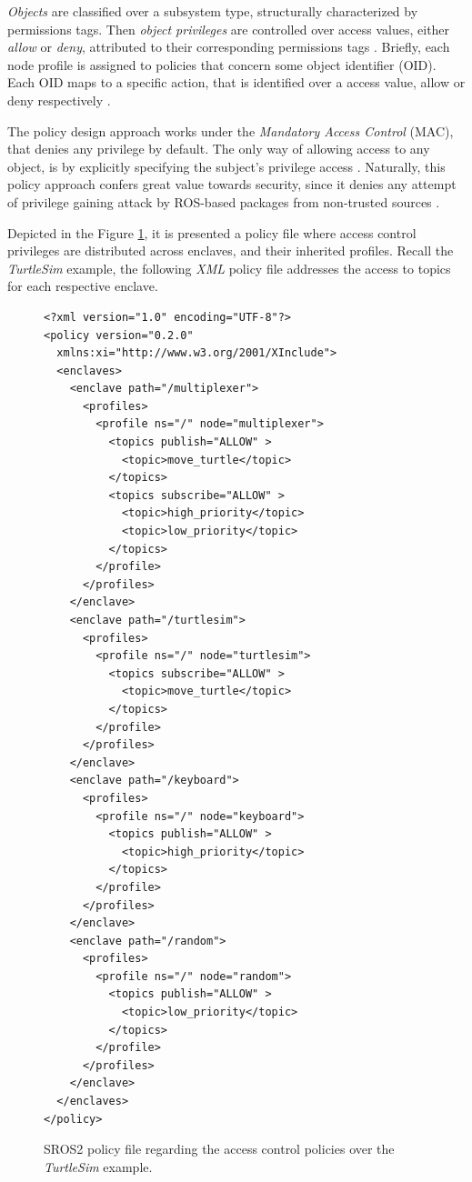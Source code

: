 \textit{Objects} are classified over a subsystem type, structurally characterized by permissions tags. Then \textit{object privileges} are controlled over access values, either \textit{allow} or \textit{deny}, attributed to their corresponding permissions tags \cite{ros-access-control, white2018procedurally}. Briefly, each node profile is assigned to policies that concern some object identifier (OID). Each OID maps to a specific action, that is identified over a access value, allow or deny respectively \cite{white2016sros}.

The policy design approach works under the \textit{Mandatory Access Control} (MAC), that denies any privilege by default. The only way of allowing access to any object, is by explicitly specifying the subject's privilege access \cite{ros-access-control, white2018procedurally, white2016sros}. Naturally, this policy approach confers great value towards security, since it denies any attempt of privilege gaining attack by ROS-based packages from non-trusted sources \cite{white2016sros}.

Depicted in the Figure \ref{fig:ros-access-file}, it is presented a policy file where access control privileges are distributed across enclaves, and their inherited profiles. Recall the \textit{TurtleSim} example, the following \textit{XML} policy file addresses the access to topics for each respective enclave. 

\begin{figure}[H]
\begin{lstlisting}[otherkeywords = {xml, version, encoding, policy, version, enclave, enclaves, profile, profiles, topic, topics, xmlns:xi, path, ns, node, publish, subscribe, reply, request, call, execute, xi:include, href, xpointer}]
<?xml version="1.0" encoding="UTF-8"?>
<policy version="0.2.0"
  xmlns:xi="http://www.w3.org/2001/XInclude">
  <enclaves>
    <enclave path="/multiplexer">
      <profiles>
        <profile ns="/" node="multiplexer">
          <topics publish="ALLOW" >
            <topic>move_turtle</topic>
          </topics>
          <topics subscribe="ALLOW" >
            <topic>high_priority</topic>
            <topic>low_priority</topic>
          </topics>
        </profile>
      </profiles>
    </enclave>
    <enclave path="/turtlesim">
      <profiles>
        <profile ns="/" node="turtlesim">
          <topics subscribe="ALLOW" >
            <topic>move_turtle</topic>
          </topics>
        </profile>
      </profiles>
    </enclave>
    <enclave path="/keyboard">
      <profiles>
        <profile ns="/" node="keyboard">
          <topics publish="ALLOW" >
            <topic>high_priority</topic>
          </topics>
        </profile>
      </profiles>
    </enclave>
    <enclave path="/random">
      <profiles>
        <profile ns="/" node="random">
          <topics publish="ALLOW" >
            <topic>low_priority</topic>
          </topics>
        </profile>
      </profiles>
    </enclave>
  </enclaves>
</policy>
\end{lstlisting}
\caption{SROS2 policy file regarding the access control policies over the \textit{TurtleSim} example.}
\label{fig:ros-access-file}
\end{figure}